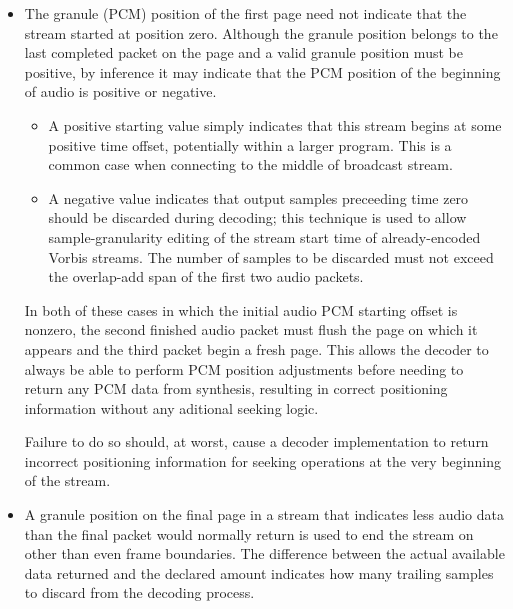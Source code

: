 \begin{itemize}
\item
    The granule (PCM) position of the first page need not indicate
    that the stream started at position zero.  Although the granule
    position belongs to the last completed packet on the page and a
    valid granule position must be positive, by
    inference it may indicate that the PCM position of the beginning
    of audio is positive or negative.


  \begin{itemize}
    \item
        A positive starting value simply indicates that this stream begins at
        some positive time offset, potentially within a larger
        program. This is a common case when connecting to the middle
        of broadcast stream.

    \item
        A negative value indicates that
        output samples preceeding time zero should be discarded during
        decoding; this technique is used to allow sample-granularity
        editing of the stream start time of already-encoded Vorbis
        streams.  The number of samples to be discarded must not exceed
        the overlap-add span of the first two audio packets.

  \end{itemize}


    In both of these cases in which the initial audio PCM starting
    offset is nonzero, the second finished audio packet must flush the
    page on which it appears and the third packet begin a fresh page.
    This allows the decoder to always be able to perform PCM position
    adjustments before needing to return any PCM data from synthesis,
    resulting in correct positioning information without any aditional
    seeking logic.


  \begin{note}
    Failure to do so should, at worst, cause a
    decoder implementation to return incorrect positioning information
    for seeking operations at the very beginning of the stream.
  \end{note}


\item
  A granule position on the final page in a stream that indicates
  less audio data than the final packet would normally return is used to
  end the stream on other than even frame boundaries.  The difference
  between the actual available data returned and the declared amount
  indicates how many trailing samples to discard from the decoding
  process.

\end{itemize}
